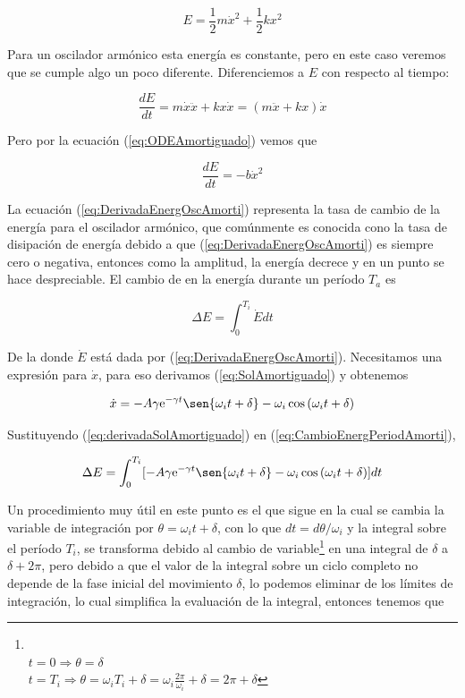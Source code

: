 \documentclass[a4paper,10pt]{article}
\numberwithin{equation}{section}
\newcommand{\euler}{\mathrm{e}}
\begin{document}
\begin{equation}
 E = \frac{1}{2} m \dot{x}^2 + \frac{1}{2} kx^2
 \label{eq:EnergiaAmorti1}
\end{equation}

Para un oscilador armónico esta energía es constante, pero en este caso veremos
que se cumple algo un poco diferente. Diferenciemos a $E$ con respecto al tiempo:

$$
\frac{dE}{dt} = m\dot{x}\ddot{x} + kx\dot{x} = (m\ddot{x}+kx)\dot{x}
$$

Pero por la ecuación (\ref{eq:ODEAmortiguado}) vemos que

\begin{equation}
\frac{dE}{dt} = - b \dot{x}^2
\label{eq:DerivadaEnergOscAmorti}
\end{equation}

La ecuación (\ref{eq:DerivadaEnergOscAmorti}) representa la tasa de cambio de la
energía para el oscilador armónico, que comúnmente es conocida cono la tasa de 
disipación de energía debido a que (\ref{eq:DerivadaEnergOscAmorti})
es siempre cero o negativa, entonces como la amplitud, la energía decrece
y en un punto se hace despreciable. El cambio de en la energía durante un período
$T_a$ es 

\begin{equation}
 \Delta E = \int_0^{T_i} \dot{E} dt
 \label{eq:CambioEnergPeriodAmorti}
\end{equation}

De la donde $\dot{E}$ está dada por (\ref{eq:DerivadaEnergOscAmorti}). Necesitamos
una expresión para $\dot{x}$, para eso derivamos (\ref{eq:SolAmortiguado}) y obtenemos

\begin{equation}
 \dot{x} = - A\gamma \euler^{-\gamma t} \sen{\omega_i t + \delta} - \omega_i \cos{(\omega_i t + \delta)}
 \label{eq:derivadaSolAmortiguado}
\end{equation}

Sustituyendo (\ref{eq:derivadaSolAmortiguado}) en (\ref{eq:CambioEnergPeriodAmorti}),

\begin{equation}
 \Delta E = \int_0^{T_i} [- A\gamma \euler^{-\gamma t} \sen{\omega_i t + \delta} - \omega_i \cos{(\omega_i t + \delta)}] dt
\end{equation}

Un procedimiento muy útil en este punto es el que sigue \cite{fowles} en la cual
se cambia la variable de integración por $\theta = \omega_i t + \delta$, con lo que
$dt = d\theta / \omega_i$ y la integral sobre el período $T_i$, se transforma debido
al cambio de variable\footnote{\\$
 t = 0 \Rightarrow \theta = \delta 
 $ \\
 $t = T_i \Rightarrow \theta = \omega_i T_i + \delta = \omega_i \frac{2\pi}{\omega_i} + \delta = 2\pi + \delta
 $} en una integral de $\delta$ a $\delta + 2\pi$, pero debido a que el valor de la 
integral sobre un ciclo completo no depende de la fase inicial del movimiento $\delta$,
lo podemos eliminar de los límites de integración, lo cual simplifica la evaluación
de la integral, entonces tenemos que
\end{document}
